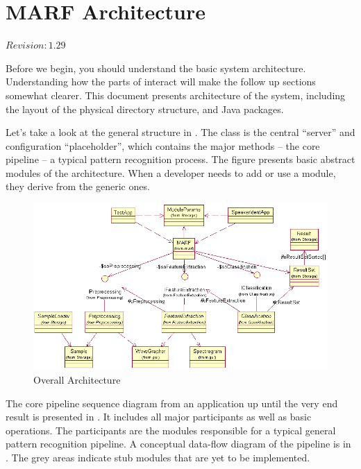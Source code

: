 \chapter{MARF Architecture}

$Revision: 1.29 $

Before we begin, you should understand the basic
{\marf} system  architecture. Understanding how the
parts of {\marf} interact will make the follow up sections
somewhat clearer. This document presents architecture
of the {\marf} system, including the layout of the physical
directory structure, and Java packages.

Let's take a look at the general {\marf} structure in .
The  class is the central ``server'' and configuration ``placeholder'', which contains the major methods --
the core pipeline -- a typical pattern recognition process.
The figure presents basic abstract modules of the architecture.
When a developer needs to add or use a module, they derive
from the generic ones.

\begin{figure}
	\centering
	\includegraphics[angle=90,totalheight=\textheight]{../graphics/arch/arch-general.png}
	\caption{Overall Architecture}
	\label{fig:arch}
\end{figure}

The core pipeline sequence diagram from an application
up until the very end result is presented in . It includes all major
participants as well as basic operations. The participants are the
modules responsible for a typical general pattern recognition pipeline.
A conceptual data-flow diagram of the pipeline is in .
The grey areas indicate stub modules that are yet to be implemented.

